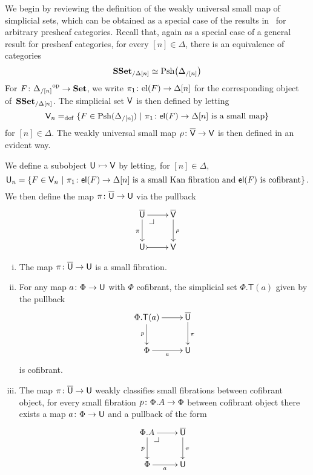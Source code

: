 \documentclass[reqno,10pt,a4paper,oneside,draft]{amsart}
\begin{document}
\medskip

We begin by reviewing the definition of the weakly universal small map of simplicial sets, which
can be obtained as a special case of the results in~\cite{hofmann-streicher-universes} for arbitrary presheaf
categories. Recall that, again as a special case of a general result for presheaf categories, for every $[n] \in \Delta$, there is an equivalence of categories
\begin{equation}
\label{equ:pshslice}
\mathbf{SSet}_{/\Delta[n]} \simeq \mathrm{Psh} \big( \Delta_{/[n]} \big )
\end{equation}
For $F \colon {\Delta_{/[n]}}^{\operatorname{op}} \to \mathbf{Set}$, we write $\pi_1 \colon \mathrm{el}(F) \to \Delta[n]$
for the corresponding object of~$\mathbf{SSet}_{/\Delta[n]}$. The simplicial set $\mathsf{V}$ is then defined by letting
\[
\mathsf{V}_n =_{\operatorname{def}} \{ F \in \mathrm{Psh}(\Delta_{/[n]}) \ | \ \pi_1 \colon \mathsf{el}(F) \to \Delta[n] \text{ is a small
map} \}
\]
for $[n] \in \Delta$. The weakly universal small map $\rho \colon \overline{\mathsf{V}} \to \mathsf{V}$ is then defined in an evident way. 

\medskip

We define a subobject $\mathsf{U} \rightarrowtail \mathsf{V}$ by letting, for $[n] \in \Delta$, 
\[
\mathsf{U}_n = \{ F \in \mathsf{V}_n \ | \ \pi_1 \colon \mathsf{el}(F) \to \Delta[n] \text{ is a small Kan fibration and $\mathsf{el}(F)$ is cofibrant} \} \, .
\]
We then define the map $\pi \colon \overline{\mathsf{U}} \to \mathsf{U}$ via the pullback 
\[
\xymatrix{
\UU \ar[r] \ar[d]_\pi \drpullback  & \VV \ar[d]^\rho \\
\U \ar@{>->}[r] & \V }
\]




\begin{proposition} \label{thm:universe-u}  \hfill 
\begin{enumerate}[(i)] 
\item The map $\pi \colon \overline{\mathsf{U}} \to \mathsf{U}$ is a small fibration.
\item For any map $a \colon \Phi \rightarrow \mathsf{U}$ with $\Phi$ cofibrant, the 
simplicial set $\Phi.\mathsf{T}(a)$ given by the pullback
\[
\xymatrix{
\Phi.\mathsf{T}(a) \ar[r] \ar[d]_p & \UU \ar[d]^\pi \\
\Phi \ar[r]_a & \U }
\]
is cofibrant.
\item The map $\pi \colon \overline{\mathsf{U}} \to \mathsf{U}$ weakly classifies small fibrations between cofibrant object, \ie 
for every small fibration $p \colon \Phi.A \to \Phi$ between cofibrant object there exists a map 
$a \colon \Phi \to \mathsf{U}$ and a pullback  of the form
\[
\xymatrix{
\Phi.A \ar[r] \ar[d]_p \drpullback & \UU \ar[d]^\pi \\
\Phi \ar[r]_{a} & \U }
\]
\end{enumerate}
\end{proposition}
\end{document}
